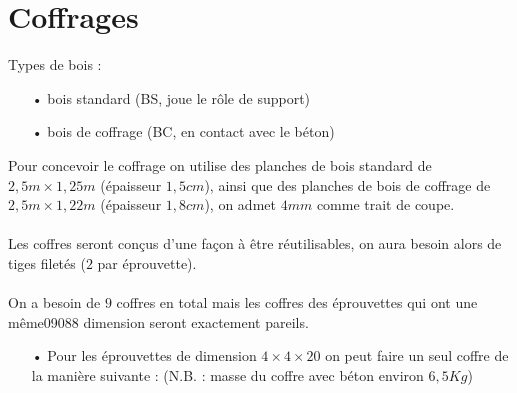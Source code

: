 \documentclass{DGC_M2_report}
\begin{document}


\section{Coffrages}
Types de bois :\\
\begin{itemize}
\item[•] bois standard (BS, joue le rôle de support)
\item[•] bois de coffrage (BC, en contact avec le béton)\\
\end{itemize}
Pour concevoir le coffrage on utilise des planches de bois standard de $2,5m \times{} 1,25m$
(épaisseur $1,5 cm$), ainsi que des planches de bois de coffrage de $2,5m \times{} 1,22m$ (épaisseur $1,8 cm$), on admet $4 mm$ comme trait de coupe.
\\\\
Les coffres seront conçus d’une façon à être réutilisables, on aura besoin alors de tiges
filetés ($2$ par éprouvette).
\\\\
On a besoin de $9$ coffres en total mais les coffres des éprouvettes qui ont une même09088
dimension seront exactement pareils.
\\
\begin{itemize}
\item[•] Pour les éprouvettes de dimension $4\times 4\times 20$ on peut faire un seul coffre de la manière
suivante : (N.B. : masse du coffre avec béton environ $6,5Kg$)
\end{itemize}
\end{document}
